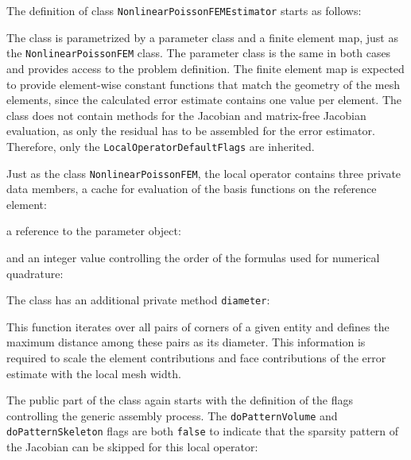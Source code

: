 \documentclass[a4paper,12pt]{article}
\begin{document}
The definition of class \lstinline{NonlinearPoissonFEMEstimator} starts as follows:

The class is parametrized by a parameter class and a finite element map, just as
the \lstinline{NonlinearPoissonFEM} class. The parameter class is the same in
both cases and provides access to the problem definition. The finite element map
is expected to provide element-wise constant functions that match the geometry
of the mesh elements, since the calculated error estimate contains one value per
element. The class does not contain methods for the Jacobian and matrix-free
Jacobian evaluation, as only the residual has to be assembled for the error
estimator. Therefore, only the \lstinline{LocalOperatorDefaultFlags} are inherited.

Just as the class \lstinline{NonlinearPoissonFEM}, the local operator contains
three private data members, a cache for evaluation of the basis functions on the
reference element:

a reference to the parameter object:

and an integer value controlling the order of the formulas used for numerical quadrature:


The class has an additional private method \lstinline{diameter}:

This function iterates over all pairs of corners of a given entity and defines
the maximum distance among these pairs as its diameter. This information is
required to scale the element contributions and face contributions of the
error estimate with the local mesh width.

The public part of the class again starts with the definition of the flags controlling
the generic assembly process. The \lstinline{doPatternVolume} and
\lstinline{doPatternSkeleton} flags are both \lstinline{false} to indicate that
the sparsity pattern of the Jacobian can be skipped for this local operator:

\end{document}
